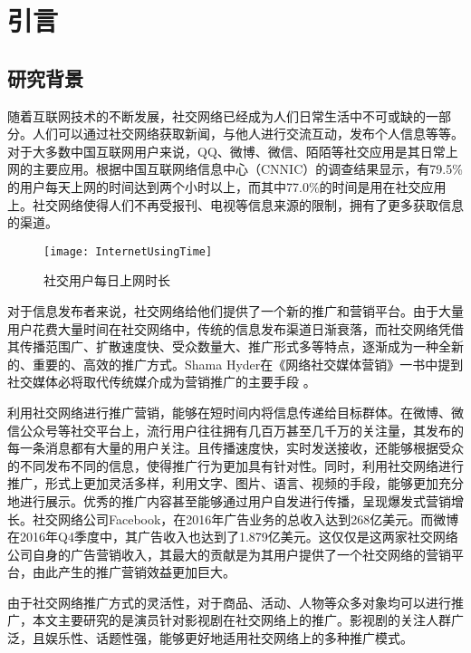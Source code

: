 \chapter{引言}


\section{研究背景}

随着互联网技术的不断发展，社交网络已经成为人们日常生活中不可或缺的一部分。人们可以通过社交网络获取新闻，与他人进行交流互动，发布个人信息等等。对于大多数中国互联网用户来说，QQ、微博、微信、陌陌等社交应用是其日常上网的主要应用。根据中国互联网络信息中心（CNNIC）的调查结果显示\cite{internetSurvey}，有79.5\%的用户每天上网的时间达到两个小时以上，而其中77.0\%的时间是用在社交应用上。社交网络使得人们不再受报刊、电视等信息来源的限制，拥有了更多获取信息的渠道。

\begin{figure}[h] 
  \centering
  \texttt{[image: InternetUsingTime]}
  \caption{社交用户每日上网时长\cite{internetSurvey}}
  \label{InternetUsingTime}
\end{figure}

对于信息发布者来说，社交网络给他们提供了一个新的推广和营销平台。由于大量用户花费大量时间在社交网络中，传统的信息发布渠道日渐衰落，而社交网络凭借其传播范围广、扩散速度快、受众数量大、推广形式多等特点，逐渐成为一种全新的、重要的、高效的推广方式。Shama Hyder在《网络社交媒体营销》一书中提到社交媒体必将取代传统媒介成为营销推广的主要手段 \cite{hyder2016zen}。

利用社交网络进行推广营销，能够在短时间内将信息传递给目标群体。在微博、微信公众号等社交平台上，流行用户往往拥有几百万甚至几千万的关注量，其发布的每一条消息都有大量的用户关注。且传播速度快，实时发送接收，还能够根据受众的不同发布不同的信息，使得推广行为更加具有针对性。同时，利用社交网络进行推广，形式上更加灵活多样，利用文字、图片、语言、视频的手段，能够更加充分地进行展示。优秀的推广内容甚至能够通过用户自发进行传播，呈现爆发式营销增长。社交网络公司Facebook，在2016年广告业务的总收入达到268亿美元\cite{Facebook}。而微博在2016年Q4季度中，其广告收入也达到了1.879亿美元\cite{微博}。这仅仅是这两家社交网络公司自身的广告营销收入，其最大的贡献是为其用户提供了一个社交网络的营销平台，由此产生的推广营销效益更加巨大。

由于社交网络推广方式的灵活性，对于商品、活动、人物等众多对象均可以进行推广，本文主要研究的是演员针对影视剧在社交网络上的推广。影视剧的关注人群广泛，且娱乐性、话题性强，能够更好地适用社交网络上的多种推广模式。

